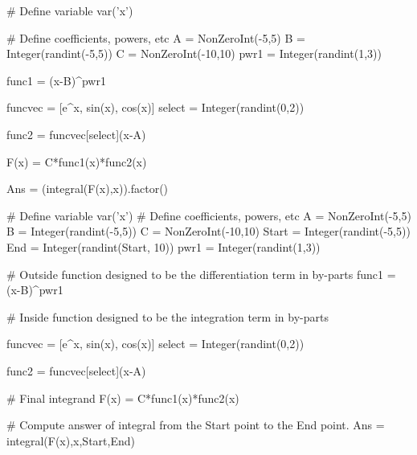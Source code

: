


\begin{sagesilent}
# Define variable
var('x')

# Define coefficients, powers, etc
A = NonZeroInt(-5,5)
B = Integer(randint(-5,5))
C = NonZeroInt(-10,10)
pwr1 = Integer(randint(1,3))

func1 = (x-B)^pwr1

funcvec = [e^x, sin(x), cos(x)]
select = Integer(randint(0,2))

func2 = funcvec[select](x-A)

F(x) = C*func1(x)*func2(x)

Ans = (integral(F(x),x)).factor()

\end{sagesilent}



\begin{sagesilent}
# Define variable
var('x')
# Define coefficients, powers, etc
A = NonZeroInt(-5,5)
B = Integer(randint(-5,5))
C = NonZeroInt(-10,10)
Start = Integer(randint(-5,5))
End = Integer(randint(Start, 10))
pwr1 = Integer(randint(1,3))

# Outside function designed to be the differentiation term in by-parts
func1 = (x-B)^pwr1

# Inside function designed to be the integration term in by-parts

funcvec = [e^x, sin(x), cos(x)]
select = Integer(randint(0,2))

func2 = funcvec[select](x-A)

# Final integrand
F(x) = C*func1(x)*func2(x)

# Compute answer of integral from the Start point to the End point.
Ans = integral(F(x),x,Start,End)

\end{sagesilent}

